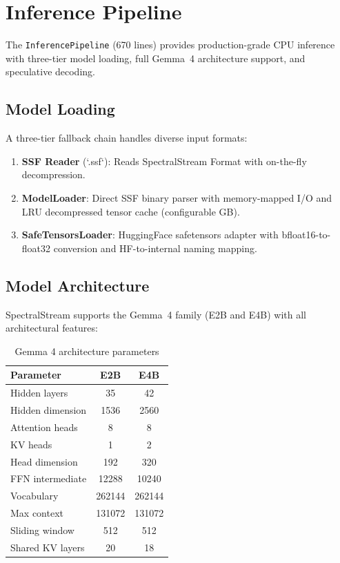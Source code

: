 \documentclass[11pt,a4paper,openright]{book}
\begin{document}
\chapter{Inference Pipeline}
\label{ch:inference}

The \texttt{InferencePipeline} (670 lines) provides production-grade CPU inference with three-tier model loading, full Gemma~4 architecture support, and speculative decoding.

\section{Model Loading}

A three-tier fallback chain handles diverse input formats:

\begin{enumerate}
	\item \textbf{SSF Reader} (`.ssf`): Reads SpectralStream Format with on-the-fly decompression.
	\item \textbf{ModelLoader}: Direct SSF binary parser with memory-mapped I/O and LRU decompressed tensor cache (configurable GB).
	\item \textbf{SafeTensorsLoader}: HuggingFace safetensors adapter with bfloat16-to-float32 conversion and HF-to-internal naming mapping.
\end{enumerate}

\section{Model Architecture}

SpectralStream supports the Gemma~4 family (E2B and E4B) with all architectural features:

\begin{table}[ht]
	\centering
	\caption{Gemma 4 architecture parameters}
	\begin{tabular}{lcc}
		\toprule
		Parameter        & E2B    & E4B    \\
		\midrule
		Hidden layers    & 35     & 42     \\
		Hidden dimension & 1536   & 2560   \\
		Attention heads  & 8      & 8      \\
		KV heads         & 1      & 2      \\
		Head dimension   & 192    & 320    \\
		FFN intermediate & 12288  & 10240  \\
		Vocabulary       & 262144 & 262144 \\
		Max context      & 131072 & 131072 \\
		Sliding window   & 512    & 512    \\
		Shared KV layers & 20     & 18     \\
		\bottomrule
	\end{tabular}
\end{table}
\end{document}
